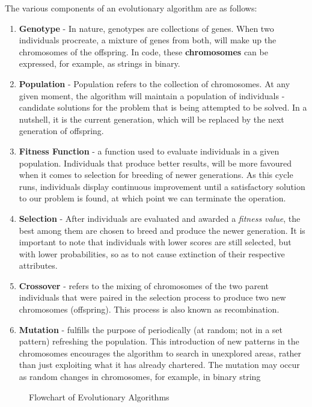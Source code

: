 \documentclass[conference,compsoc]{IEEEtran}
\begin{document}
The various components of an evolutionary algorithm are as follows:
\begin{enumerate}
    \item \textbf{Genotype} - In nature, genotypes are collections of genes. When two individuals procreate, a mixture of genes 
    from both, will make up the chromosomes of the offspring. In code, these \textbf{chromosomes} 
    can be expressed, for example, as strings in binary. 
    \item \textbf{Population} - Population refers to the collection of chromosomes. At any given moment, the 
    algorithm will maintain a population of individuals - candidate solutions for the problem that is being attempted 
    to be solved. In a nutshell, it is the current generation, which will be replaced by the next generation of offspring. 
    \item \textbf{Fitness Function} - a function used to evaluate individuals in a given population. Individuals 
    that produce better results, will be more favoured when it comes to selection for breeding of newer generations. As this cycle runs, 
    individuals display continuous improvement until a satisfactory solution to our problem is found, at which point we can terminate the operation.
    \item \textbf{Selection} - After individuals are evaluated and awarded a \textit{fitness value}, 
    the best among them are chosen to breed and produce the newer generation. It is important to note 
    that individuals with lower scores are still selected, but with lower probabilities, so as to not 
    cause extinction of their respective attributes.
    \item \textbf{Crossover} - refers to the mixing of chromosomes of the two parent individuals 
    that were paired in the selection process to produce two new chromosomes (offspring). This process is also known as recombination.
    \item \textbf{Mutation} - fulfills the purpose of periodically (at random; not in a set pattern) refreshing 
    the population. This introduction of new patterns in the chromosomes encourages the algorithm to search in unexplored areas, rather than 
    just exploiting what it has already chartered. The mutation may occur as random changes in chromosomes, for example, in binary string 
\end{enumerate}
\begin{figure}[h]
  \centering
  \caption{Flowchart of Evolutionary Algorithms}
\end{figure}
\end{document}
